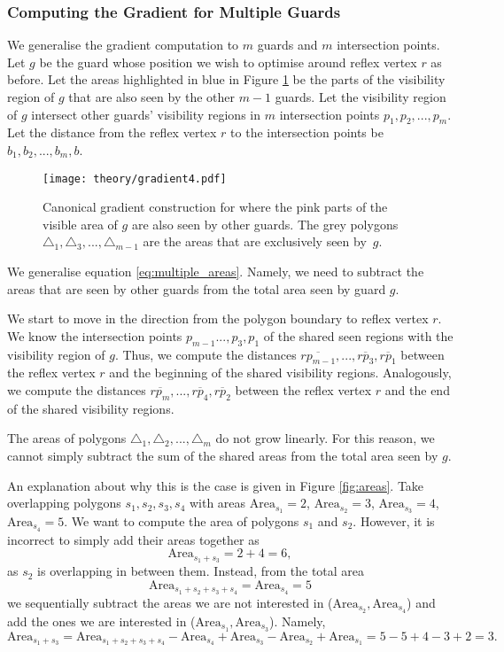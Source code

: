 \subsubsection{Computing the Gradient for Multiple Guards}
We generalise the gradient computation to $m$ guards and $m$ intersection points. Let $g$ be the guard whose position we wish to optimise around reflex vertex $r$ as before. Let the areas highlighted in blue in Figure \ref{fig:general_gradient} be the parts of the visibility region of $g$ that are also seen by the other $m - 1$ guards. Let the visibility region of $g$ intersect other guards' visibility regions in $m$ intersection points $p_1, p_2, ..., p_m$. Let the distance from the reflex vertex $r$ to the intersection points be $b_{1}, b_{2}, ..., b_{m}, b$.

\begin{figure}[h!]
    \centering
    \texttt{[image: theory/gradient4.pdf]}
    \caption{Canonical gradient construction for where the pink parts of the visible area of $g$ are also seen by other guards. The grey polygons $\triangle_1, \triangle_3, ..., \triangle_{m - 1}$ are the areas that are exclusively seen by~$g$.}
    \label{fig:general_gradient} 
\end{figure}

We generalise equation \ref{eq:multiple_areas}. Namely, we need to subtract the areas that are seen by other guards from the total area seen by guard $g$. 

We start to move in the direction from the polygon boundary to reflex vertex $r$. We know the intersection points $p_{m - 1} ..., p_3, p_1$ of the shared seen regions with the visibility region of $g$. Thus, we  compute the distances $\overline{rp_{m - 1}}, ..., \overline{rp_3}, \overline{rp_1}$ between the reflex vertex $r$ and the beginning of the shared visibility regions. Analogously, we  compute the distances $\overline{rp_m}, ...,  \overline{rp_4}, \overline{rp_2}$ between the reflex vertex $r$ and the end of the shared visibility regions.

The areas of polygons $\triangle_1, \triangle_2, ..., \triangle_m$ do not grow linearly. For this reason, we cannot simply subtract the sum of the shared areas from the total area seen by $g$. 

An explanation about why this is the case is given in Figure \ref{fig:areas}. Take overlapping polygons $s_1, s_2, s_3, s_4$ with areas $\text{Area}_{s_1} = 2$, $\text{Area}_{s_2} = 3$, $\text{Area}_{s_3} = 4$, $\text{Area}_{s_4} = 5$. We want to compute the area of polygons $s_1$ and $s_2$. However, it is incorrect to simply add their areas together as $$\text{Area}_{s_1 + s_3} = 2 + 4 = 6,$$ as $s_2$ is overlapping in between them. Instead, from the total area $$\text{Area}_{s_1 + s_2 + s_3 + s_4} = \text{Area}_{s_4} = 5$$ we  sequentially subtract the areas we are not interested in ($\text{Area}_{s_2}, \text{Area}_{s_4}$) and add the ones we are interested in ($\text{Area}_{s_1}, \text{Area}_{s_3}$). Namely, $$\text{Area}_{s_1 + s_3} = \text{Area}_{s_1 + s_2 + s_3 + s_4} - \text{Area}_{s_4} + \text{Area}_{s_3} - \text{Area}_{s_2} + \text{Area}_{s_1} = 5 - 5 + 4 - 3 + 2 = 3.$$

